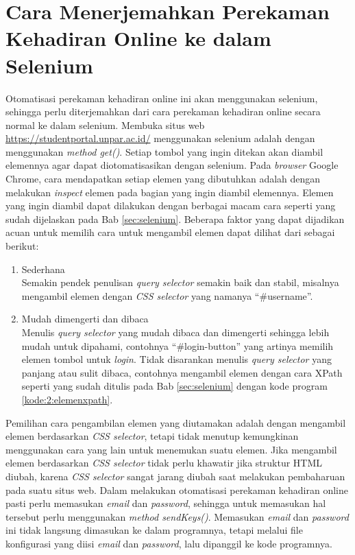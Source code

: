 \section{Cara Menerjemahkan Perekaman Kehadiran Online ke dalam Selenium}
\label{sec:terjemah} 
Otomatisasi perekaman kehadiran online ini akan menggunakan selenium, sehingga perlu diterjemahkan dari cara perekaman kehadiran online secara normal ke dalam selenium. Membuka situs web \url{https://studentportal.unpar.ac.id/} menggunakan selenium adalah dengan menggunakan \textit{method get()}. Setiap tombol yang ingin ditekan akan diambil elemennya agar dapat diotomatisasikan dengan selenium. Pada \textit{browser} Google Chrome, cara mendapatkan setiap elemen yang dibutuhkan adalah dengan melakukan \textit{inspect} elemen pada bagian yang ingin diambil elemennya. Elemen yang ingin diambil dapat dilakukan dengan berbagai macam cara seperti yang sudah dijelaskan pada Bab \ref{sec:selenium}. Beberapa faktor yang dapat dijadikan acuan untuk memilih cara untuk mengambil elemen dapat dilihat dari sebagai berikut:
\begin{enumerate}
	\item Sederhana \\
	Semakin pendek penulisan \textit{query selector} semakin baik dan stabil, misalnya mengambil elemen dengan \textit{CSS selector} yang namanya ``\#username''.
 	\item Mudah dimengerti dan dibaca \\
 	Menulis \textit{query selector} yang mudah dibaca dan dimengerti sehingga lebih mudah untuk dipahami, contohnya ``\#login-button'' yang artinya memilih elemen tombol untuk \textit{login}. Tidak disarankan menulis \textit{query selector} yang panjang atau sulit dibaca, contohnya mengambil elemen dengan cara XPath seperti yang sudah ditulis pada Bab \ref{sec:selenium} dengan kode program \ref{kode:2:elemenxpath}.
\end{enumerate}
Pemilihan cara pengambilan elemen yang diutamakan adalah dengan mengambil elemen berdasarkan \textit{CSS selector}, tetapi tidak menutup kemungkinan menggunakan cara yang lain untuk menemukan suatu elemen. Jika mengambil elemen berdasarkan \textit{CSS selector} tidak perlu khawatir jika struktur HTML diubah, karena \textit{CSS selector} sangat jarang diubah saat melakukan pembaharuan pada suatu situs web. 
Dalam melakukan otomatisasi perekaman kehadiran online pasti perlu memasukan \textit{email} dan \textit{password}, sehingga untuk memasukan hal tersebut perlu menggunakan \textit{method sendKeys()}. Memasukan \textit{email} dan \textit{password} ini tidak langsung dimasukan ke dalam programnya, tetapi melalui file konfigurasi yang diisi \textit{email} dan \textit{password}, lalu dipanggil ke kode programnya. 

